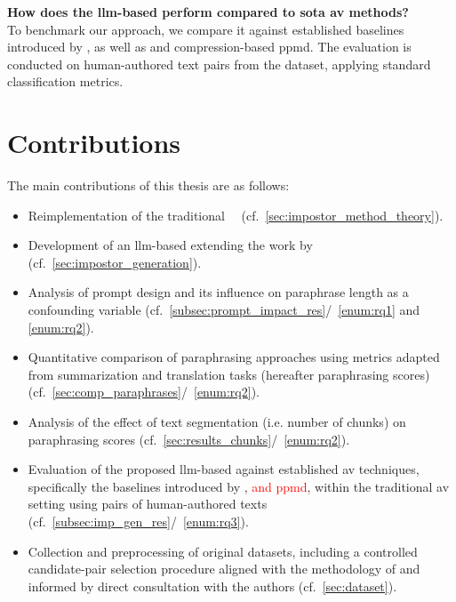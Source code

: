 \begin{questions}
    \item \textbf{How does the \ac{llm}-based \impAppr{} perform compared to \acl{sota} \ac{av} methods?} \label{enum:rq3} \hfill \\
    To benchmark our approach, we compare it against established baselines introduced by \citet{koppel_determining_2014}, as well as \unmasking{} and compression-based \ac{ppmd}. 
    The evaluation is conducted on human-authored text pairs from the \dataStudent{} dataset, applying standard classification metrics. 
    
\end{questions}



\section{Contributions}
\label{sec:contributions}
The main contributions of this thesis are as follows:
\begin{itemize}
    \item Reimplementation of the traditional \impAppr{}~\citep{koppel_determining_2014}\ (cf.~\autoref{sec:impostor_method_theory}).
    \item Development of an \ac{llm}-based \impAppr{} extending the work by \citet{koppel_determining_2014} (cf.~\autoref{sec:impostor_generation}). 
    \item Analysis of prompt design and its influence on paraphrase length as a confounding variable (cf.~\autoref{subsec:prompt_impact_res}/~\ref{enum:rq1} and \ref{enum:rq2}).
    \item Quantitative comparison of paraphrasing approaches using metrics adapted from summarization and translation tasks (hereafter paraphrasing scores) (cf.~\autoref{sec:comp_paraphrases}/~\ref{enum:rq2}).
    \item Analysis of the effect of text segmentation (i.e. number of chunks) on paraphrasing scores (cf.~\autoref{sec:results_chunks}/~\ref{enum:rq2}).
    \item Evaluation of the proposed \ac{llm}-based \impAppr{} against established \ac{av} techniques, specifically the baselines introduced by \citet{koppel_determining_2014}, \textcolor{red}{\unmasking{} and \ac{ppmd}}, within the traditional \ac{av} setting using pairs of human-authored texts (cf.~\autoref{subsec:imp_gen_res}/~\ref{enum:rq3}).
    \item Collection and preprocessing of original datasets, including a controlled candidate-pair selection procedure aligned with the methodology of \citet{koppel_determining_2014} and informed by direct consultation with the authors (cf.~\autoref{sec:dataset}).

\end{itemize}



